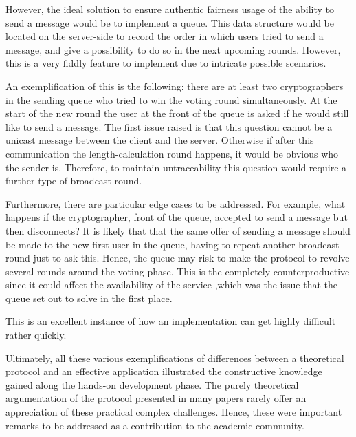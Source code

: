 However, the ideal solution to ensure authentic fairness usage of the ability to send a message would be to implement a queue. This data structure would be located on the server-side to record the order in which users tried to send a message, and give a possibility to do so in the next upcoming rounds. However, this is a very fiddly feature to implement due to intricate possible scenarios. 

An exemplification of this is the following: there are at least two cryptographers in the sending queue who tried to win the voting round simultaneously. At the start of the new round the user at the front of the queue is asked if he would still like to send a message. The first issue raised is that this question cannot be a unicast message between the client and the server. Otherwise if after this communication the length-calculation round happens, it would be obvious who the sender is. Therefore, to maintain untraceability this question would require a further type of broadcast round. 

Furthermore, there are particular edge cases to be addressed. For example, what happens if the cryptographer, front of the queue, accepted to send a message but then disconnects? It is likely that that the same offer of sending a message should be made to the new first user in the queue, having to repeat another broadcast round just to ask this. Hence, the queue may risk to make the protocol to revolve several rounds around the voting phase. This is the completely counterproductive since it could affect the availability of the service ,which was the issue that the queue set out to solve in the first place. 

This is an excellent instance of how an implementation can get highly difficult rather quickly. \newline \newline




Ultimately, all these various exemplifications of differences between a theoretical protocol and an effective application illustrated the constructive knowledge gained along the hands-on development phase. The purely theoretical argumentation of the protocol presented in many papers rarely offer an appreciation of these practical complex challenges. Hence, these were important remarks to be addressed as a contribution to the academic community.

